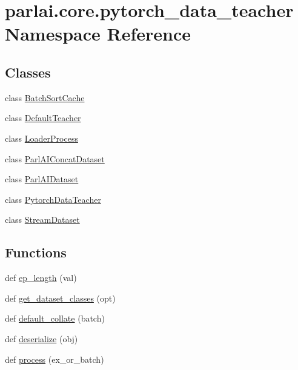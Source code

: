 \hypertarget{namespaceparlai_1_1core_1_1pytorch__data__teacher}{}\section{parlai.\+core.\+pytorch\+\_\+data\+\_\+teacher Namespace Reference}
\label{namespaceparlai_1_1core_1_1pytorch__data__teacher}
\subsection*{Classes}
\begin{DoxyCompactItemize}
\item 
class \hyperlink{classparlai_1_1core_1_1pytorch__data__teacher_1_1BatchSortCache}{Batch\+Sort\+Cache}
\item 
class \hyperlink{classparlai_1_1core_1_1pytorch__data__teacher_1_1DefaultTeacher}{Default\+Teacher}
\item 
class \hyperlink{classparlai_1_1core_1_1pytorch__data__teacher_1_1LoaderProcess}{Loader\+Process}
\item 
class \hyperlink{classparlai_1_1core_1_1pytorch__data__teacher_1_1ParlAIConcatDataset}{Parl\+A\+I\+Concat\+Dataset}
\item 
class \hyperlink{classparlai_1_1core_1_1pytorch__data__teacher_1_1ParlAIDataset}{Parl\+A\+I\+Dataset}
\item 
class \hyperlink{classparlai_1_1core_1_1pytorch__data__teacher_1_1PytorchDataTeacher}{Pytorch\+Data\+Teacher}
\item 
class \hyperlink{classparlai_1_1core_1_1pytorch__data__teacher_1_1StreamDataset}{Stream\+Dataset}
\end{DoxyCompactItemize}
\subsection*{Functions}
\begin{DoxyCompactItemize}
\item 
def \hyperlink{namespaceparlai_1_1core_1_1pytorch__data__teacher_afbd22acd239efcdb6afb94db83ee3493}{ep\+\_\+length} (val)
\item 
def \hyperlink{namespaceparlai_1_1core_1_1pytorch__data__teacher_acd56d9ac5d68831c1e91690f26eb2328}{get\+\_\+dataset\+\_\+classes} (opt)
\item 
def \hyperlink{namespaceparlai_1_1core_1_1pytorch__data__teacher_a7236aa20497f2a598df9b85909901184}{default\+\_\+collate} (batch)
\item 
def \hyperlink{namespaceparlai_1_1core_1_1pytorch__data__teacher_a0c6f08553514c14d037da194f9d112ae}{deserialize} (obj)
\item 
def \hyperlink{namespaceparlai_1_1core_1_1pytorch__data__teacher_a7b71207eb86027bc93809c1e4d57f641}{process} (ex\+\_\+or\+\_\+batch)
\end{DoxyCompactItemize}
